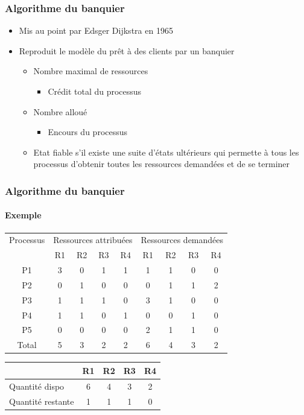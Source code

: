 \begin{frame}
\frametitle{Algorithme du banquier}
\begin{itemize}
\item Mis au point par Edsger Dijkstra en 1965
\item Reproduit le modèle du prêt à des clients par un banquier
\begin{itemize}
\item Nombre maximal de ressources
\begin{itemize}
\item Crédit total du processus
\end{itemize}
\item Nombre alloué
\begin{itemize}
\item Encours du processus
\end{itemize}
\item Etat fiable s'il existe une suite d'états ultérieurs qui permette à tous les processus d'obtenir toutes les ressources demandées et de se terminer
\end{itemize}
\end{itemize}
\end{frame}

\begin{frame}
\frametitle{Algorithme du banquier}
\framesubtitle{Exemple}
\begin{tabular}{|c|c|c|c|c|c|c|c|c|}
\hline
Processus & \multicolumn{4}{c|}{Ressources attribuées} & \multicolumn{4}{c|}{Ressources demandées} \\
 & R1 & R2 & R3 & R4 & R1 & R2 & R3 & R4 \\
\hline
P1   &3&0&1&1&1&1&0&0 \\
P2   &0&1&0&0&0&1&1&2\\
P3   &1&1&1&0&3&1&0&0\\
P4   &1&1&0&1&0&0&1&0\\
P5   &0&0&0&0&2&1&1&0\\
\hline
Total&5&3&2&2&6&4&3&2\\
\hline
\end{tabular}

\begin{center}
\begin{tabular}{|l|c|c|c|c|}
\hline
& R1 & R2 & R3 & R4 \\
\hline
Quantité dispo & 6 & 4 & 3 & 2 \\
Quantité restante & 1 & 1 & 1 & 0 \\
\hline
\end{tabular}
\end{center}
\end{frame}


